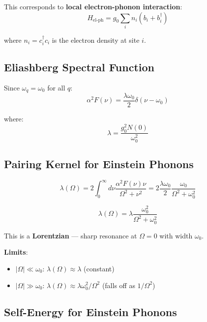 \documentclass[12pt]{article}
\begin{document}
This corresponds to \textbf{local electron-phonon interaction}:
\begin{equation}
H_{\text{el-ph}} = g_0 \sum_i n_i (b_i + b^\dagger_i)
\end{equation}

where $n_i = c^\dagger_i c_i$ is the electron density at site $i$.

\subsection{Eliashberg Spectral Function}

Since $\omega_q = \omega_0$ for all $q$:
\begin{equation}
\boxed{
\alpha^2F(\nu) = \frac{\lambda \omega_0}{2} \delta(\nu - \omega_0)
}
\end{equation}

where:
\begin{equation}
\lambda = \frac{g_0^2 N(0)}{\omega_0^2}
\end{equation}

\subsection{Pairing Kernel for Einstein Phonons}

\begin{equation}
\lambda(\Omega) = 2\int_0^{\infty} d\nu \frac{\alpha^2F(\nu) \nu}{\Omega^2 + \nu^2}
= 2 \frac{\lambda \omega_0}{2} \frac{\omega_0}{\Omega^2 + \omega_0^2}
\end{equation}

\begin{equation}
\boxed{
\lambda(\Omega) = \lambda \frac{\omega_0^2}{\Omega^2 + \omega_0^2}
}
\end{equation}

This is a \textbf{Lorentzian} — sharp resonance at $\Omega = 0$ with width $\omega_0$.

\textbf{Limits}:
\begin{itemize}
\item $|\Omega| \ll \omega_0$: $\lambda(\Omega) \approx \lambda$ (constant)
\item $|\Omega| \gg \omega_0$: $\lambda(\Omega) \approx \lambda \omega_0^2/\Omega^2$ (falls off as $1/\Omega^2$)
\end{itemize}

\subsection{Self-Energy for Einstein Phonons}
\end{document}
